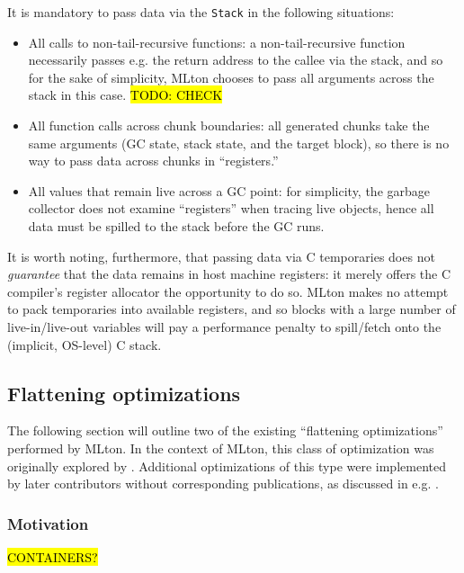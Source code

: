 \documentclass[leqno,11pt]{article}
\begin{document}
It is mandatory to pass data via the \texttt{Stack} in the following situations:

\begin{itemize}
\item All calls to non-tail-recursive functions: a non-tail-recursive function
  necessarily passes e.g. the return address to the callee via the stack, and so
  for the sake of simplicity, MLton chooses to pass all arguments across the
  stack in this case. \hl{TODO: CHECK}
 
\item All function calls across chunk boundaries: all generated chunks take the
  same arguments (GC state, stack state, and the target block), so there is no
  way to pass data across chunks in ``registers.''

\item All values that remain live across a GC point: for simplicity, the garbage
  collector does not examine ``registers'' when tracing live objects, hence all
  data must be spilled to the stack before the GC runs.

\end{itemize}

It is worth noting, furthermore, that passing data via C temporaries does not
\textit{guarantee} that the data remains in host machine registers: it merely
offers the C compiler's register allocator the opportunity to do so. MLton makes
no attempt to pack temporaries into available registers, and so blocks with a
large number of live-in/live-out variables will pay a performance penalty to
spill/fetch onto the (implicit, OS-level) C stack.



\subsection{Flattening optimizations}
The following section will outline two of the existing ``flattening
optimizations'' performed by MLton. In the context of MLton, this class of
optimization was originally explored by \cite{flat-paper}. Additional
optimizations of this type were implemented by later contributors without
corresponding publications, as discussed in e.g. \cite{deep-flat-email}.

\subsubsection{Motivation}

\hl{CONTAINERS?}
\end{document}
